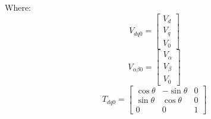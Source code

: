 Where:
\begin{equation*}
    V_{dq0} = \begin{bmatrix}
        V_d \\
        V_q \\
        V_0
    \end{bmatrix}
\end{equation*}
\begin{equation*}
    V_{\alpha\beta0} = \begin{bmatrix}
        V_\alpha \\
        V_\beta  \\
        V_0
    \end{bmatrix}
\end{equation*}
\begin{equation*}
    T_{dq0} =
    \begin{bmatrix}
        \cos \theta & -\sin \theta & 0 \\
        \sin \theta & \cos \theta  & 0 \\
        0           & 0            & 1
    \end{bmatrix}
\end{equation*}
